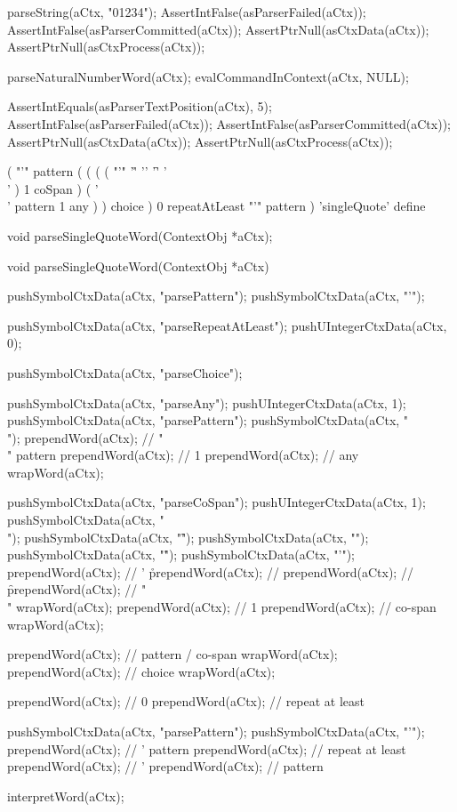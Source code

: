   parseString(aCtx, "01234");
  AssertIntFalse(asParserFailed(aCtx));
  AssertIntFalse(asParserCommitted(aCtx));
  AssertPtrNull(asCtxData(aCtx));
  AssertPtrNull(asCtxProcess(aCtx));
  
  parseNaturalNumberWord(aCtx);
  evalCommandInContext(aCtx, NULL);
  
  AssertIntEquals(asParserTextPosition(aCtx), 5);
  AssertIntFalse(asParserFailed(aCtx));
  AssertIntFalse(asParserCommitted(aCtx));
  AssertPtrNull(asCtxData(aCtx));
  AssertPtrNull(asCtxProcess(aCtx));
\stopCTest
\stopTestCase
\stopTestSuite

\startTestSuite[parseSingleQuoteWord]

\starttyping
(
  "'" pattern
  ( 
    (
      ( ( "'" '\r' '\n' '\f' '\\' ) 1 coSpan )
      ( '\\' pattern 1 any )
    ) choice
  ) 0 repeatAtLeast
  "'" pattern
) 'singleQuote' define
\stoptyping

\startCHeader
void parseSingleQuoteWord(ContextObj *aCtx);
\stopCHeader

\startCCode
void parseSingleQuoteWord(ContextObj *aCtx) {

  pushSymbolCtxData(aCtx, "parsePattern");
  pushSymbolCtxData(aCtx, "'");

  pushSymbolCtxData(aCtx, "parseRepeatAtLeast");
  pushUIntegerCtxData(aCtx, 0);

  pushSymbolCtxData(aCtx, "parseChoice");

  pushSymbolCtxData(aCtx, "parseAny");
  pushUIntegerCtxData(aCtx, 1);
  pushSymbolCtxData(aCtx, "parsePattern");
  pushSymbolCtxData(aCtx, "\\");
  prependWord(aCtx);  // "\\" pattern
  prependWord(aCtx);  // 1
  prependWord(aCtx);  // any
  wrapWord(aCtx);

  pushSymbolCtxData(aCtx, "parseCoSpan");
  pushUIntegerCtxData(aCtx, 1);
  pushSymbolCtxData(aCtx, "\\");
  pushSymbolCtxData(aCtx, "\f");
  pushSymbolCtxData(aCtx, "\n");
  pushSymbolCtxData(aCtx, "\r");
  pushSymbolCtxData(aCtx, "'");
  prependWord(aCtx);  // ' \r
  prependWord(aCtx);  // \n
  prependWord(aCtx);  // \f
  prependWord(aCtx);  // "\\"
  wrapWord(aCtx);
  prependWord(aCtx);  // 1
  prependWord(aCtx);  // co-span
  wrapWord(aCtx);
  
  prependWord(aCtx);  // pattern / co-span
  wrapWord(aCtx);
  prependWord(aCtx);  // choice
  wrapWord(aCtx);
  
  prependWord(aCtx);  // 0
  prependWord(aCtx);  // repeat at least

  pushSymbolCtxData(aCtx, "parsePattern");
  pushSymbolCtxData(aCtx, "'");
  prependWord(aCtx);  // ' pattern
  prependWord(aCtx);  // repeat at least
  prependWord(aCtx);  // '
  prependWord(aCtx);  // pattern

  interpretWord(aCtx);
}
\stopCCode

